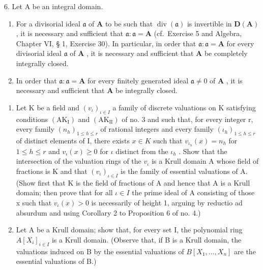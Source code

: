 6. Let A be an integral domain.\par

\begin{enumerate}
\def\labelenumi{(\alph{enumi})}
\item
  For a divisorial ideal \(\mathfrak{a}\) of \(\mathbf{A}\) to be such that \(\operatorname{div}(\mathfrak{a})\) is invertible in \(\mathbf{D}(\mathbf{A})\) , it is necessary and sufficient that \(\mathfrak{a} \colon \mathfrak{a} = \mathbf{A}\) (cf.~Exercise 5 and Algebra, Chapter VI, § 1, Exercise 30). In particular, in order that \(\mathfrak{a} \colon \mathfrak{a} = \mathbf{A}\) for every divisorial ideal \(\mathfrak{a}\) of \(\mathbf{A}\) , it is necessary and sufficient that \(\mathbf{A}\) be completely integrally closed.
\item
  In order that \(\mathfrak{a} \colon \mathfrak{a} = \mathbf{A}\) for every finitely generated ideal \(\mathfrak{a} \neq 0\) of \(\mathbf{A}\) , it is necessary and sufficient that \(\mathbf{A}\) be integrally closed.
\end{enumerate}

\begin{enumerate}
\def\labelenumi{\arabic{enumi}.}
\setcounter{enumi}{6}
\item
  Let K be a field and \((v_{\iota})_{\iota \in I}\) a family of discrete valuations on K satisfying conditions \((\mathrm{AK}_{\mathrm{I}})\) and \((\mathrm{AK}_{\mathrm{II}})\) of no. 3 and such that, for every integer r, every family \((n_{h})_{1 \leqslant h \leqslant r}\) of rational integers and every family \((\iota_{h})_{1 \leqslant h \leqslant r}\) of distinct elements of I, there exists \(x \in K\) such that \(v_{\iota_{h}}(x) = n_{h}\) for \(1 \leqslant h \leqslant r\) and \(v_{\iota}(x) \geqslant 0\) for \(\iota\) distinct from the \(\iota_{h}\) . Show that the intersection of the valuation rings of the \(v_{\iota}\) is a Krull domain A whose field of fractions is K and that \((v_{\iota})_{\iota \in I}\) is the family of essential valuations of A. (Show first that K is the field of fractions of A and hence that A is a Krull domain; then prove that for all \(\iota \in I\) the prime ideal of A consisting of those x such that \(v_{\iota}(x) > 0\) is necessarily of height 1, arguing by reductio ad absurdum and using Corollary 2 to Proposition 6 of no. 4.)
\item
  Let A be a Krull domain; show that, for every set I, the polynomial ring \(A[X_{i}]_{i\in I}\) is a Krull domain. (Observe that, if B is a Krull domain, the valuations induced on B by the essential valuations of \(B[X_{1},\ldots,X_{n}]\) are the essential valuations of B.)
\end{enumerate}

